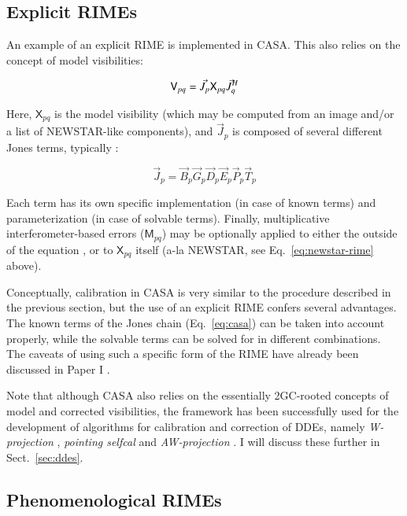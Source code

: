 \documentclass{aa}
\newcommand{\herm}{H}
\newcommand{\jones}[2]{\vec {#1}_{#2}}
\newcommand{\jonesT}[2]{\vec {#1}^{\herm}_{#2}}
\newcommand{\coh}[2]{\mathsf{{#1}}_{{#2}}}
\begin{document}
\subsection{Explicit RIMEs}

An example of an explicit RIME is implemented in CASA. This also relies on the concept of model visibilities:

\begin{equation}\label{eq:casa-rime}
\coh{V}{pq}  =  \jones{J}{p} \coh{X}{pq} \jonesT{J}{q} \\
\end{equation}

Here, $\coh{X}{pq}$ is the model visibility (which may be computed from an image and/or
a list of NEWSTAR-like components), and $\jones{J}{p}$ is composed of several different Jones terms, typically \citep[Appendix E.1]{CASA:UserRef}:

\begin{equation}\label{eq:casa}
\jones{J}{p} = \jones{B}{p} \jones{G}{p} \jones{D}{p} \jones{E}{p} \jones{P}{p} \vec  T_p
\end{equation}

Each term has its own specific implementation (in case of known terms) and parameterization (in case of solvable terms). Finally, multiplicative interferometer-based errors ($\coh{M}{pq}$) may be optionally applied to either the outside of the equation \citep[as per Eq.~24 of Paper I,][]{RRIME1}, or to $\coh{X}{pq}$ itself (a-la NEWSTAR, see Eq.~\ref{eq:newstar-rime} above). 

Conceptually, calibration in CASA is very similar to the procedure described in the previous section, but the use of an explicit RIME confers several advantages. The known terms of the Jones chain (Eq.~\ref{eq:casa}) can be taken into account properly, while the solvable terms can be solved for in different combinations. The caveats of using such a specific form of the RIME have already been discussed in Paper I \citep[Sect.~6.2]{RRIME1}.

Note that although CASA also relies on the essentially 2GC-rooted concepts of model and corrected visibilities, the framework has been successfully used for the development of algorithms for calibration and correction of DDEs, namely \emph{W-projection} \citep{Cornwell:wproj}, \emph{pointing selfcal} \citep{SB:pointing} and \emph{AW-projection} \citep{SB:imageplane}. I will discuss these further in Sect.~\ref{sec:ddes}.

\subsection{\label{sec:phenomenological}Phenomenological RIMEs}
\end{document}
